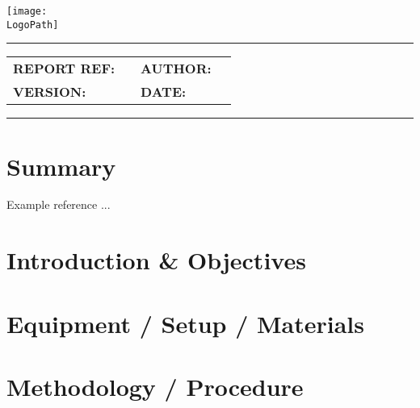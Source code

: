 \documentclass[10pt]{article}
\makeatletter
\newcommand{\customtitle}{%
  \noindent
  \begin{minipage}[t]{0.65\textwidth}
    \vspace{-0.5cm}
    {\ocrfamily\Large\bfseries \DocumentType \par}
  \end{minipage}%
  \begin{minipage}[t]{0.35\textwidth}
    \flushright{}
    \texttt{[image: \\LogoPath]}
  \end{minipage}

  \vspace{0.3cm}
  \hrule height 0.8pt
  \vspace{0.3cm}

  {\ocrfamily\bfseries\ProjectFullRef\par}
  {\ocrfamily\large\bfseries\ReportTitle\par}

  \vspace{0.5em}

  \begin{tabular}{@{}ll@{\hspace{2cm}}ll@{}}
    \ocrfamily\textbf{REPORT REF:} & \ocrfamily \ReportRef &
    \ocrfamily\textbf{AUTHOR:}     & \ocrfamily \AuthorName \\

    \ocrfamily\textbf{VERSION:}    & \ocrfamily \DocVersion &
    \ocrfamily\textbf{DATE:}       & \ocrfamily \ReleaseDate \\
  \end{tabular}

  \vspace{0.3cm}
  \hrule height 0.8pt
  \vspace{0.25cm}
}
\makeatother
\begin{document}
\vspace*{-1cm}
\thispagestyle{plain}
\customtitle{}




\section{Summary}

Example reference \cite{hibbeler2016mechanics}...

\section{Introduction \& Objectives}

\section{Equipment / Setup / Materials} %

\section{Methodology / Procedure}
\end{document}
